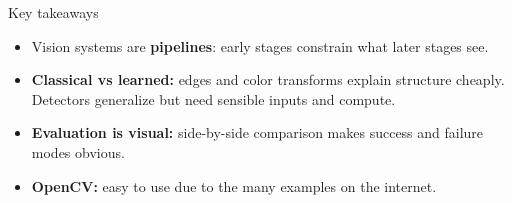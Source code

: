 \documentclass[aspectratio=169]{beamer}
\begin{document}
\begin{frame}{Key takeaways}
  \begin{itemize}
    \item Vision systems are \textbf{pipelines}: early stages constrain what later stages see.
    \item \textbf{Classical vs learned:} edges and color transforms explain structure cheaply. Detectors generalize but need sensible inputs and compute.
    \item \textbf{Evaluation is visual:} side-by-side comparison makes success and failure modes obvious.
    \item \textbf{OpenCV:} easy to use due to the many examples on the internet.
  \end{itemize}
\end{frame}
\end{document}
